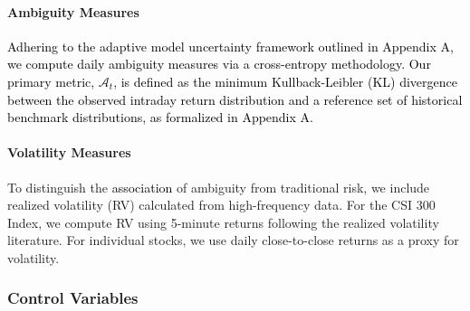 \documentclass[preprint,12pt,authoryear]{elsarticle}
\begin{document}
\paragraph{Ambiguity Measures}
\textcolor{black}{Adhering to the adaptive model uncertainty framework outlined in Appendix A, we compute daily ambiguity measures via a cross-entropy methodology. Our primary metric, $\mathcal{A}_t$, is defined as the minimum Kullback-Leibler (KL) divergence between the observed intraday return distribution and a reference set of historical benchmark distributions, as formalized in Appendix A.}


\paragraph{Volatility Measures}
To distinguish the \textcolor{black}{association} of ambiguity from traditional risk, we include realized volatility (RV) calculated from high-frequency data. For the CSI 300 Index, we compute RV using 5-minute returns following the realized volatility literature. For individual stocks, we use daily close-to-close returns as a proxy for volatility.

\subsubsection{Control Variables}
\end{document}
